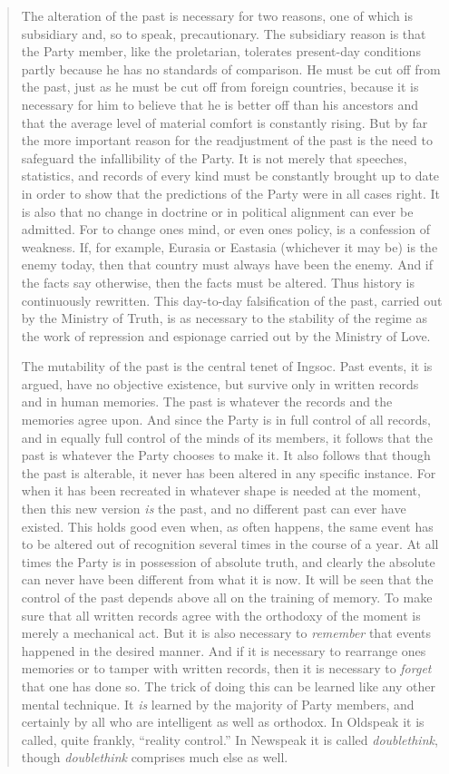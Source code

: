 \begin{quotation}
The alteration of the past is necessary for two reasons, one of which is
subsidiary and, so to speak, precautionary. The subsidiary reason is
that the Party member, like the proletarian, tolerates present-day
conditions partly because he has no standards of comparison. He must be
cut off from the past, just as he must be cut off from foreign
countries, because it is necessary for him to believe that he is better
off than his ancestors and that the average level of material comfort is
constantly rising. But by far the more important reason for the
readjustment of the past is the need to safeguard the infallibility of
the Party. It is not merely that speeches, statistics, and records of
every kind must be constantly brought up to date in order to show that
the predictions of the Party were in all cases right. It is also that no
change in doctrine or in political alignment can ever be admitted. For
to change one\textquotesingle s mind, or even one\textquotesingle s
policy, is a confession of weakness. If, for example, Eurasia or
Eastasia (whichever it may be) is the enemy today, then that country
must always have been the enemy. And if the facts say otherwise, then
the facts must be altered. Thus history is continuously rewritten. This
day-to-day falsification of the past, carried out by the Ministry of
Truth, is as necessary to the stability of the regime as the work of
repression and espionage carried out by the Ministry of Love.

The mutability of the past is the central tenet of Ingsoc. Past events,
it is argued, have no objective existence, but survive only in written
records and in human memories. The past is whatever the records and the
memories agree upon. And since the Party is in full control of all
records, and in equally full control of the minds of its members, it
follows that the past is whatever the Party chooses to make it. It also
follows that though the past is alterable, it never has been altered in
any specific instance. For when it has been recreated in whatever shape
is needed at the moment, then this new version \emph{is} the past, and
no different past can ever have existed. This holds good even when, as
often happens, the same event has to be altered out of recognition
several times in the course of a year. At all times the Party is in
possession of absolute truth, and clearly the absolute can never have
been different from what it is now. It will be seen that the control of
the past depends above all on the training of memory. To make sure that
all written records agree with the orthodoxy of the moment is merely a
mechanical act. But it is also necessary to \emph{remember} that events
happened in the desired manner. And if it is necessary to rearrange
one\textquotesingle s memories or to tamper with written records, then
it is necessary to \emph{forget} that one has done so. The trick of
doing this can be learned like any other mental technique. It \emph{is}
learned by the majority of Party members, and certainly by all who are
intelligent as well as orthodox. In Oldspeak it is called, quite
frankly, ``reality control.'' In Newspeak it is called \emph{doublethink},
though \emph{doublethink} comprises much else as well.


\end{quotation}
